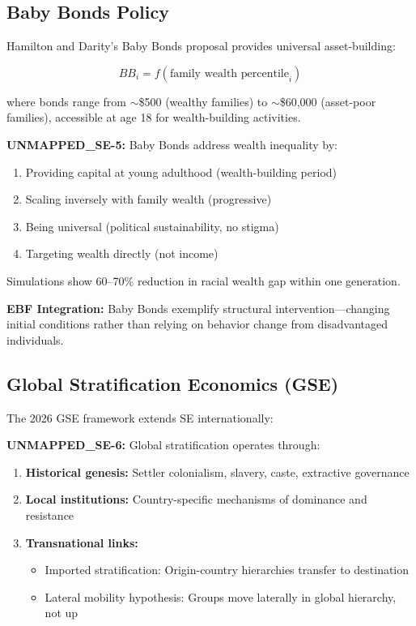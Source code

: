 \subsection{Baby Bonds Policy}
\label{subsec:se-baby-bonds}

Hamilton and Darity's Baby Bonds proposal provides universal asset-building:

\begin{equation}
BB_i = f(\text{family wealth percentile}_i)
\label{eq:se-baby-bonds}
\end{equation}

where bonds range from $\sim$\$500 (wealthy families) to $\sim$\$60,000 (asset-poor families), accessible at age 18 for wealth-building activities.

\begin{axiom}
\label{ax:se-5}
\textbf{UNMAPPED_SE-5:} Baby Bonds address wealth inequality by:
\begin{enumerate}
    \item Providing capital at young adulthood (wealth-building period)
    \item Scaling inversely with family wealth (progressive)
    \item Being universal (political sustainability, no stigma)
    \item Targeting wealth directly (not income)
\end{enumerate}
Simulations show 60--70\% reduction in racial wealth gap within one generation.
\end{axiom}

\textbf{EBF Integration:} Baby Bonds exemplify structural intervention---changing initial conditions rather than relying on behavior change from disadvantaged individuals.

\subsection{Global Stratification Economics (GSE)}
\label{subsec:se-gse}

The 2026 GSE framework \citep{aja2026global} extends SE internationally:

\begin{axiom}
\label{ax:se-6}
\textbf{UNMAPPED_SE-6:} Global stratification operates through:
\begin{enumerate}
    \item \textbf{Historical genesis:} Settler colonialism, slavery, caste, extractive governance
    \item \textbf{Local institutions:} Country-specific mechanisms of dominance and resistance
    \item \textbf{Transnational links:}
    \begin{itemize}
        \item Imported stratification: Origin-country hierarchies transfer to destination
        \item Lateral mobility hypothesis: Groups move laterally in global hierarchy, not up
    \end{itemize}
\end{enumerate}
\end{axiom}

